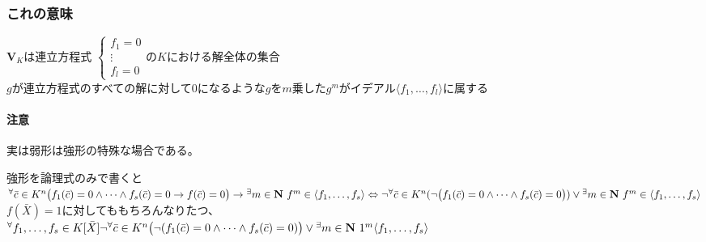 \documentclass[12pt,a4paper]{article}
\begin{document}
  \subsubsection*{これの意味}
    $\mathbf{V}_K$は連立方程式
    $\begin{cases}
      f_1 = 0 \\
      \vdots \\
      f_l = 0
    \end{cases}$の$K$における解全体の集合 \\
    $g$が連立方程式のすべての解に対して$0$になるような$g$を$m$乗した$g^m$がイデアル$\langle f_1, \ldots, f_l \rangle$に属する

  \paragraph{注意}
    実は弱形は強形の特殊な場合である。

    強形を論理式のみで書くと\\
    ${}^\forall \bar{c} \in K^n \big( f_1  (\bar{c}) = 0 \wedge \cdots \wedge f_s(\bar{c}) = 0 \rightarrow f(\bar{c}) = 0\big) \rightarrow {}^\exists m \in \mathbf{N} \ f^m \in \langle f_1, \ldots , f_s \rangle \\
    \Leftrightarrow \\
    \lnot {}^\forall \bar{c} \in K^n ( \lnot \big(f_1(\bar{c}) = 0 \wedge \cdots \wedge f_s(\bar{c}) = 0\big) )\vee {}^\exists m \in \mathbf{N} \ f^m \in \langle f_1, \ldots, f_s \rangle$ \\
    $f(\bar{X})=1$に対してももちろんなりたつ、\\
    ${}^\forall f_1, \ldots, f_s \in K \lbrack \bar{X} \rbrack \\
    \lnot {}^\forall \bar{c} \in K^n \big(\lnot (f_1 (\bar{c}) = 0 \wedge \cdots \wedge f_s(\bar{c}) = 0)\big) \vee {}^\exists m \in \mathbf{N} \ 1^m \langle f_1, \ldots, f_s \rangle $
\end{document}
